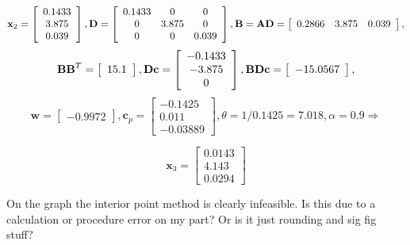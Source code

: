 \documentclass{article}
\begin{document}
\begin{enumerate}
\begin{itemize}
				\begin{displaymath}
					\mathbf{x}_2 = \left[ \begin{array}{c} 0.1433 \\ 3.875 \\ 0.039 \end{array} \right],
					\mathbf{D} = \left[ \begin{array}{c c c} 0.1433 & 0 & 0 \\ 0 & 3.875 & 0 \\ 0 & 0 & 0.039 \end{array} \right],
					\mathbf{B} = \mathbf{AD} = \left[ \begin{array}{c c c} 0.2866 & 3.875 & 0.039 \end{array} \right],
				\end{displaymath}
				\begin{displaymath}
					\mathbf{BB}^T = \left[ \begin{array}{c} 15.1 \end{array} \right], \mathbf{Dc} = \left[ \begin{array}{c c c} -0.1433 \\ -3.875 \\ 0 \end{array} \right], \mathbf{BDc} = \left[ \begin{array}{c} -15.0567 \end{array} \right],
				\end{displaymath}
				\begin{displaymath}
					\mathbf{w} = \left[ \begin{array}{c} -0.9972 \end{array} \right], \mathbf{c}_p = \left[ \begin{array}{r} -0.1425 \\ 0.011 \\ -0.03889 \end{array} \right], \theta = 1/0.1425 = 7.018, \alpha = 0.9 \Rightarrow
				\end{displaymath}

				\begin{displaymath}
					\mathbf{x}_3 = \left[ \begin{array}{c} 0.0143 \\ 4.143 \\ 0.0294 \end{array} \right]
				\end{displaymath}

				On the graph the interior point method is clearly infeasible. Is this due to a calculation or procedure error on my part? Or is it just rounding and sig fig stuff?


\end{itemize}
\end{enumerate}
\end{document}
